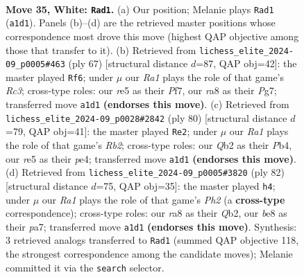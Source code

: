 \documentclass[11pt]{article}
\begin{document}
\clearpage

\begin{figure}[p]\centering
\begin{subfigure}{0.46\textwidth}\centering
\resizebox{\linewidth}{!}{%
\newchessgame
\chessboard[
  setfen={r3b1k1/p4pP1/8/p3r3/4pq2/PP5K/1Q3P2/R3R3 w - - 0 35},
  showmover=false,
  pgfstyle=straightmove, color=movearrow, markmove={a1-d1}
]}
\caption{}
\end{subfigure}\hfill
\begin{subfigure}{0.46\textwidth}\centering
\resizebox{\linewidth}{!}{%
\newchessgame
\chessboard[
  setfen={2r3k1/p4pp1/1qr4p/5Q2/8/7P/P2R1PP1/3R2K1 b - - 5 34},
  showmover=false,
  pgfstyle=straightmove, color=movearrow, markmove={c6-f6}
]}
\caption{}
\end{subfigure}
\\[4pt]
\begin{subfigure}{0.46\textwidth}\centering
\resizebox{\linewidth}{!}{%
\newchessgame
\chessboard[
  setfen={3r2k1/4r1p1/7p/4q2P/1PPpp1Q1/6P1/1R4K1/3R4 w - - 3 41},
  showmover=false,
  pgfstyle=straightmove, color=movearrow, markmove={b2-e2}
]}
\caption{}
\end{subfigure}\hfill
\begin{subfigure}{0.46\textwidth}\centering
\resizebox{\linewidth}{!}{%
\newchessgame
\chessboard[
  setfen={6k1/p1rr3p/1p2q1p1/1P6/5P2/P3P1R1/1Q1R1K1P/8 w - - 15 42},
  showmover=false,
  pgfstyle=straightmove, color=movearrow, markmove={h2-h4}
]}
\caption{}
\end{subfigure}
\caption{\textbf{Move 35, White: \texttt{Rad1}.} (a) Our position; Melanie plays \texttt{Rad1} (\texttt{a1d1}). Panels (b)--(d) are the retrieved master positions whose correspondence most drove this move (highest QAP objective among those that transfer to it). (b) Retrieved from \texttt{lichess\_elite\_2024-09\_p0005\#463} (ply 67) [structural distance $d$=87, QAP obj=42]: the master played \texttt{Rf6}; under $\mu$ our \emph{Ra1} plays the role of that game's \emph{Rc3}; cross-type roles: our \emph{r}e5 as their \emph{P}f7, our \emph{r}a8 as their \emph{P}g7; transferred move \texttt{a1d1} \textbf{(endorses this move)}. (c) Retrieved from \texttt{lichess\_elite\_2024-09\_p0028\#2842} (ply 80) [structural distance $d$=79, QAP obj=41]: the master played \texttt{Re2}; under $\mu$ our \emph{Ra1} plays the role of that game's \emph{Rb2}; cross-type roles: our \emph{Q}b2 as their \emph{P}b4, our \emph{r}e5 as their \emph{p}e4; transferred move \texttt{a1d1} \textbf{(endorses this move)}. (d) Retrieved from \texttt{lichess\_elite\_2024-09\_p0005\#3820} (ply 82) [structural distance $d$=75, QAP obj=35]: the master played \texttt{h4}; under $\mu$ our \emph{Ra1} plays the role of that game's \emph{Ph2} (a \textbf{cross-type} correspondence); cross-type roles: our \emph{r}a8 as their \emph{Q}b2, our \emph{b}e8 as their \emph{p}a7; transferred move \texttt{a1d1} \textbf{(endorses this move)}. Synthesis: 3 retrieved analogs transferred to \texttt{Rad1} (summed QAP objective 118, the strongest correspondence among the candidate moves); Melanie committed it via the \texttt{search} selector.}
\label{fig:thought-m68}
\end{figure}
\end{document}
